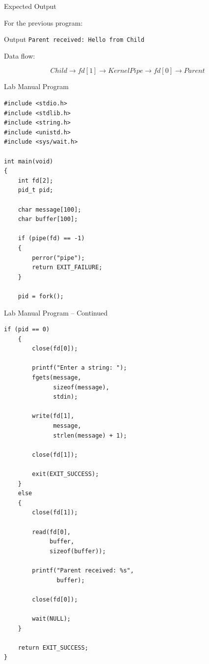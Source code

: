 \documentclass[aspectratio=169]{beamer}
\begin{document}
\begin{frame}{Expected Output}

For the previous program:

\begin{block}{Output}
\texttt{Parent received: Hello from Child}
\end{block}

\vspace{0.5cm}

Data flow:

\[
\boxed{
Child
\rightarrow
fd[1]
\rightarrow
Kernel Pipe
\rightarrow
fd[0]
\rightarrow
Parent
}
\]

\end{frame}

\begin{frame}[fragile]{Lab Manual Program}

\begin{lstlisting}[style=cstyle]
#include <stdio.h>
#include <stdlib.h>
#include <string.h>
#include <unistd.h>
#include <sys/wait.h>

int main(void)
{
    int fd[2];
    pid_t pid;

    char message[100];
    char buffer[100];

    if (pipe(fd) == -1)
    {
        perror("pipe");
        return EXIT_FAILURE;
    }

    pid = fork();
\end{lstlisting}

\end{frame}

\begin{frame}[fragile]{Lab Manual Program -- Continued}

\begin{lstlisting}[style=cstyle]
    if (pid == 0)
    {
        close(fd[0]);

        printf("Enter a string: ");
        fgets(message,
              sizeof(message),
              stdin);

        write(fd[1],
              message,
              strlen(message) + 1);

        close(fd[1]);

        exit(EXIT_SUCCESS);
    }
    else
    {
        close(fd[1]);

        read(fd[0],
             buffer,
             sizeof(buffer));

        printf("Parent received: %s",
               buffer);

        close(fd[0]);

        wait(NULL);
    }

    return EXIT_SUCCESS;
}
\end{lstlisting}

\end{frame}
\end{document}
